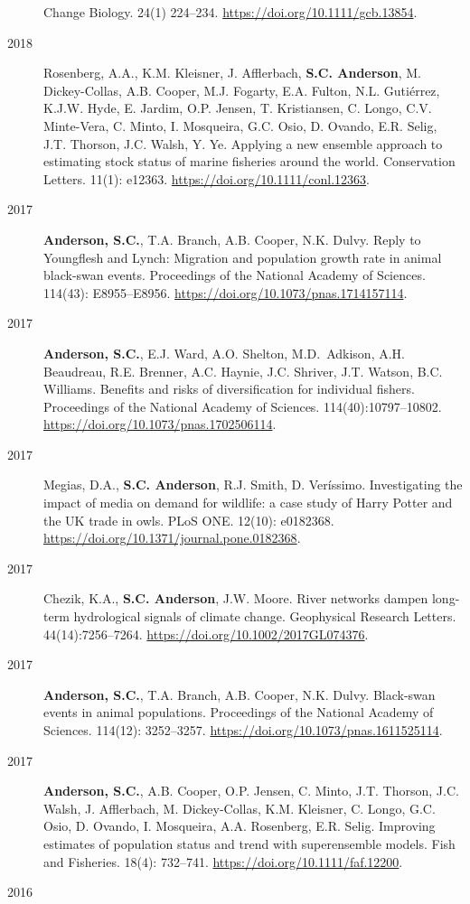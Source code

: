 \begin{description}
Change Biology. 24(1) 224--234. \url{https://doi.org/10.1111/gcb.13854}.
\item[2018]
Rosenberg, A.A., K.M. Kleisner, J. Afflerbach, \textbf{S.C. Anderson},
M. Dickey-Collas, A.B. Cooper, M.J. Fogarty, E.A. Fulton, N.L.
Gutiérrez, K.J.W. Hyde, E. Jardim, O.P. Jensen, T. Kristiansen, C.
Longo, C.V. Minte-Vera, C. Minto, I. Mosqueira, G.C. Osio, D. Ovando,
E.R. Selig, J.T. Thorson, J.C. Walsh, Y. Ye. Applying a new ensemble
approach to estimating stock status of marine fisheries around the
world. Conservation Letters. 11(1): e12363.
\url{https://doi.org/10.1111/conl.12363}.
\item[2017]
\textbf{Anderson, S.C.}, T.A. Branch, A.B. Cooper, N.K. Dulvy. Reply to
Youngflesh and Lynch: Migration and population growth rate in animal
black-swan events. Proceedings of the National Academy of Sciences.
114(43): E8955--E8956. \url{https://doi.org/10.1073/pnas.1714157114}.
\item[2017]
\textbf{Anderson, S.C.}, E.J. Ward, A.O. Shelton, M.D.\ Adkison, A.H.
Beaudreau, R.E. Brenner, A.C. Haynie, J.C. Shriver, J.T. Watson, B.C.
Williams. Benefits and risks of diversification for individual fishers.
Proceedings of the National Academy of Sciences. 114(40):10797--10802.
\url{https://doi.org/10.1073/pnas.1702506114}.
\item[2017]
Megias, D.A., \textbf{S.C. Anderson}, R.J. Smith, D. Veríssimo.
Investigating the impact of media on demand for wildlife: a case study
of Harry Potter and the UK trade in owls. PLoS ONE. 12(10): e0182368.
\url{https://doi.org/10.1371/journal.pone.0182368}.
\item[2017]
Chezik, K.A., \textbf{S.C. Anderson}, J.W. Moore. River networks dampen
long-term hydrological signals of climate change. Geophysical Research
Letters. 44(14):7256--7264. \url{https://doi.org/10.1002/2017GL074376}.
\item[2017]
\textbf{Anderson, S.C.}, T.A. Branch, A.B. Cooper, N.K. Dulvy.
Black-swan events in animal populations. Proceedings of the National
Academy of Sciences. 114(12): 3252--3257.
\url{https://doi.org/10.1073/pnas.1611525114}.
\item[2017]
\textbf{Anderson, S.C.}, A.B. Cooper, O.P. Jensen, C. Minto, J.T.
Thorson, J.C. Walsh, J. Afflerbach, M. Dickey-Collas, K.M. Kleisner, C.
Longo, G.C. Osio, D. Ovando, I. Mosqueira, A.A. Rosenberg, E.R. Selig.
Improving estimates of population status and trend with superensemble
models. Fish and Fisheries. 18(4): 732--741.
\url{https://doi.org/10.1111/faf.12200}.
\item[2016]

\end{description}

